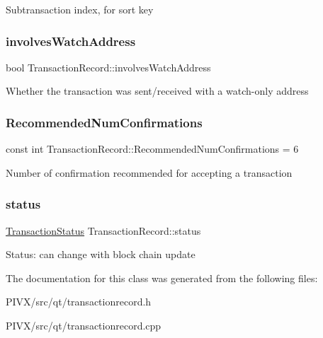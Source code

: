 Subtransaction index, for sort key \mbox{\label{class_transaction_record_ac938161128e04ca5d044d8a19827b0e2}} 
\subsubsection{\texorpdfstring{involves\+Watch\+Address}{involvesWatchAddress}}
{\footnotesize\ttfamily bool Transaction\+Record\+::involves\+Watch\+Address}

Whether the transaction was sent/received with a watch-\/only address \mbox{\label{class_transaction_record_a1cdf534b1ab2495c839f87beb053eaf8}} 
\subsubsection{\texorpdfstring{Recommended\+Num\+Confirmations}{RecommendedNumConfirmations}}
{\footnotesize\ttfamily const int Transaction\+Record\+::\+Recommended\+Num\+Confirmations = 6\hspace{0.3cm}{\ttfamily [static]}}

Number of confirmation recommended for accepting a transaction \mbox{\label{class_transaction_record_a50342213092284a9994f2903991134c0}} 
\subsubsection{\texorpdfstring{status}{status}}
{\footnotesize\ttfamily \mbox{\hyperlink{class_transaction_status}{Transaction\+Status}} Transaction\+Record\+::status}

Status\+: can change with block chain update 

The documentation for this class was generated from the following files\+:\begin{DoxyCompactItemize}
\item 
P\+I\+V\+X/src/qt/transactionrecord.\+h\item 
P\+I\+V\+X/src/qt/transactionrecord.\+cpp\end{DoxyCompactItemize}
